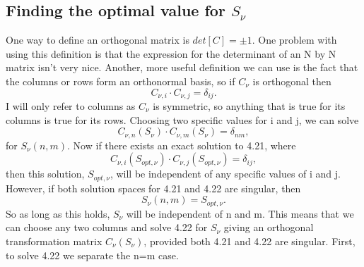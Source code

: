\documentclass[10pt]{article}
\numberwithin{equation}{section}
\begin{document}
\begin{multicols}{2}
\subsection{Finding the optimal value for $S_{\nu}$}
One way to define an orthogonal matrix is $det[C] = \pm1$. One problem with using this definition is that the expression for the determinant of an N by N matrix isn't very nice. Another, more useful definition we can use is the fact that the columns or rows form an orthonormal basis, so if $C_{\nu}$ is orthogonal then
\begin{equation}
C_{\nu,i}\cdot C_{\nu,j}= \delta_{ij}.
\end{equation}
I will only refer to columns as $C_{\nu}$ is symmetric, so anything that is true for its columns is true for its rows. 
Choosing two specific values for i and j, we can solve 
\begin{equation}
C_{\nu,n}(S_{\nu})\cdot C_{\nu,m}(S_{\nu})= \delta_{nm},
\end{equation}
for $S_{\nu}(n,m)$. Now if there exists an exact solution to 4.21, where 
\begin{equation}
C_{\nu,i}(S_{opt,\nu})\cdot C_{\nu,j}(S_{opt,\nu})= \delta_{ij},
\end{equation}
then this solution, $S_{opt,\nu}$, will be independent of any specific values of i and j. However, if both solution spaces for 4.21 and 4.22 are singular, then 
\begin{equation}
S_{\nu}(n,m) = S_{opt,\nu}.
\end{equation}
So as long as this holds, $S_{\nu}$ will be independent of n and m. This means that we can choose any two columns and solve 4.22 for $S_{\nu}$ giving an orthogonal transformation matrix $C_{\nu}(S_{\nu})$, provided both 4.21 and 4.22 are singular. First, to solve 4.22 we separate the n=m case.


\end{multicols}
\end{document}
